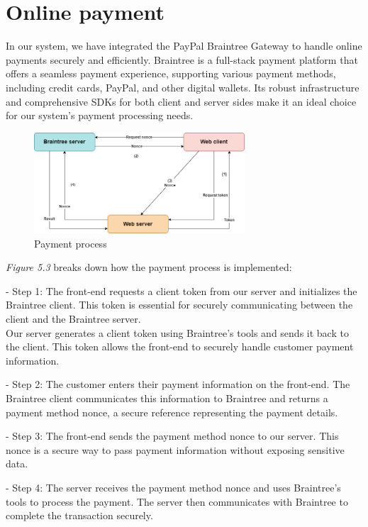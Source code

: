 \section{Online payment}

In our system, we have integrated the PayPal Braintree Gateway to handle online payments securely and efficiently. Braintree is a full-stack payment platform that offers a seamless payment experience, supporting various payment methods, including credit cards, PayPal, and other digital wallets. Its robust infrastructure and comprehensive SDKs for both client and server sides make it an ideal choice for our system's payment processing needs.

\begin{figure}[H]
    \centering
    \includegraphics[width=0.7\textwidth]{Figures/payment-strat.png}
    \caption{Payment process}
\end{figure}

\emph{Figure 5.3} breaks down how the payment process is implemented:

- Step 1:
The front-end requests a client token from our server and initializes the Braintree client. This token is essential for securely communicating between the client and the Braintree server.\\
Our server generates a client token using Braintree's tools and sends it back to the client. This token allows the front-end to securely handle customer payment information.

- Step 2:
The customer enters their payment information on the front-end. The Braintree client communicates this information to Braintree and returns a payment method nonce, a secure reference representing the payment details.

- Step 3:
The front-end sends the payment method nonce to our server. This nonce is a secure way to pass payment information without exposing sensitive data.

- Step 4:
The server receives the payment method nonce and uses Braintree's tools to process the payment. The server then communicates with Braintree to complete the transaction securely.

